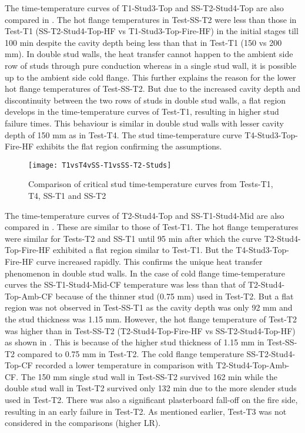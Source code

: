 The time-temperature curves of T1-Stud3-Top and SS-T2-Stud4-Top are also compared in . The hot flange temperatures in Test-SS-T2 were less than those in Test-T1 (SS-T2-Stud4-Top-HF vs T1-Stud3-Top-Fire-HF) in the initial stages till 100 min despite the cavity depth being less than that in Test-T1 (150 vs 200 mm). In double stud walls, the heat transfer cannot happen to the ambient side row of studs through pure conduction whereas in a single stud wall, it is possible up to the ambient side cold flange. This further explains the reason for the lower hot flange temperatures of Test-SS-T2. But due to the increased cavity depth and discontinuity between the two rows of studs in double stud walls, a flat region develops in the time-temperature curves of Test-T1, resulting in higher stud failure times. This behaviour is similar in double stud walls with lesser cavity depth of 150 mm as in Test-T4. The stud time-temperature curve T4-Stud3-Top-Fire-HF exhibits the flat region confirming the assumptions.
\begin{figure}[!htbp]
	\centering
		\texttt{[image: T1vsT4vSS-T1vsSS-T2-Studs]}  
	\caption{Comparison of critical stud time-temperature curves from Tests-T1, T4, SS-T1 and SS-T2}
	\label{fig:T1vsT4vSS-T1vsSS-T2-Studs}
\end{figure}

The time-temperature curves of T2-Stud4-Top and SS-T1-Stud4-Mid are also compared in . These are similar to those of Test-T1. The hot flange temperatures were similar for Tests-T2 and SS-T1 until 95 min after which the curve T2-Stud4-Top-Fire-HF exhibited a flat region similar to Test-T1. But the T4-Stud3-Top-Fire-HF curve increased rapidly. This confirms the unique heat transfer phenomenon in double stud walls. In the case of cold flange time-temperature curves the SS-T1-Stud4-Mid-CF temperature was less than that of T2-Stud4-Top-Amb-CF because of the thinner stud (0.75 mm) used in Test-T2. But a flat region was not observed in Test-SS-T1 as the cavity depth was only 92 mm and the stud thickness was 1.15 mm. However, the hot flange temperature of Test-T2 was higher than in Test-SS-T2 (T2-Stud4-Top-Fire-HF vs SS-T2-Stud4-Top-HF) as shown in . This is because of the higher stud thickness of 1.15 mm in Test-SS-T2 compared to 0.75 mm in Test-T2. The cold flange temperature SS-T2-Stud4-Top-CF recorded a lower temperature in comparison with T2-Stud4-Top-Amb-CF. The 150 mm single stud wall in Test-SS-T2 survived 162 min while the double stud wall in Test-T2 survived only 132 min due to the more slender studs used in Test-T2. There was also a significant plasterboard fall-off on the fire side, resulting in an early failure in Test-T2. As mentioned earlier, Test-T3 was not considered in the comparisons (higher LR).

